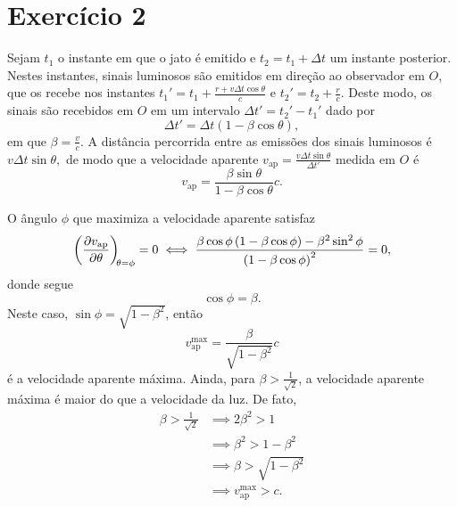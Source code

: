 \documentclass[12pt,a4paper]{article}
\numberwithin{equation}{section}
\begin{document}
\section*{Exercício 2}
Sejam \(t_1\) o instante em que o jato é emitido e \(t_2 = t_1 + \Delta t\) um instante posterior. Nestes instantes, sinais luminosos são emitidos em direção ao observador em \(O\), que os recebe nos instantes \(t_1' = t_1 + \frac{r + v\Delta t \cos\theta}{c}\) e \(t_2' = t_2 + \frac{r}{c}\). Deste modo, os sinais são recebidos em \(O\) em um intervalo \(\Delta t' = t_2' - t_1'\) dado por
\begin{equation*}
    \Delta t' = \Delta t \left(1 - \beta\cos\theta\right),
\end{equation*}
em que \(\beta = \frac{v}{c}\). A distância percorrida entre as emissões dos sinais luminosos é \(v\Delta t \sin\theta,\) de modo que a velocidade aparente \(v_{\mathrm{ap}} = \frac{v \Delta t \sin\theta}{\Delta t'}\) medida em \(O\) é
\begin{equation*}
    v_{\mathrm{ap}} = \frac{\beta \sin \theta}{1 - \beta \cos \theta}c.
\end{equation*}

O ângulo \(\phi\) que maximiza a velocidade aparente satisfaz
\begin{equation*}
    \diffp{v_\mathrm{ap}}{\theta}[\theta = \phi] = 0 \iff \frac{\beta \cos \phi \left(1 - \beta \cos\phi\right) - \beta^2\sin^2\phi}{\left(1 - \beta \cos\phi\right)^2} = 0,
\end{equation*}
donde segue
\begin{equation*}
    \cos\phi = \beta.
\end{equation*}
Neste caso, \(\sin \phi = \sqrt{1 - \beta^2}\), então
\begin{equation*}
    v_\mathrm{ap}^\mathrm{max} = \frac{\beta}{\sqrt{1-\beta^2}} c
\end{equation*}
é a velocidade aparente máxima. Ainda, para \(\beta > \frac{1}{\sqrt2}\), a velocidade aparente máxima é maior do que a velocidade da luz. De fato,
\begin{align*}
    \beta > \frac{1}{\sqrt{2}} &\implies 2\beta^2 > 1\\
                               &\implies \beta^2 > 1 - \beta^2\\
                               &\implies \beta > \sqrt{1 - \beta^2}\\
                               &\implies v_\mathrm{ap}^\mathrm{max} > c.
\end{align*}
\end{document}
